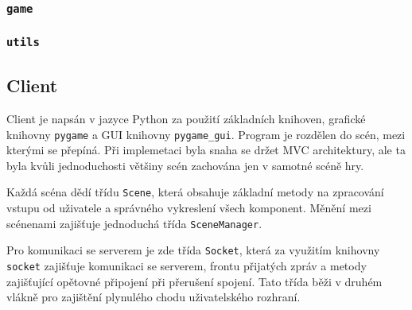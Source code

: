 \documentclass[11pt,a4paper]{article}
\begin{document}
\subsubsection{\texttt{game}}
\subsubsection{\texttt{utils}}

\subsection{Client}
Client je napsán v jazyce Python za použití základních knihoven, grafické knihovny \texttt{pygame} a GUI knihovny \texttt{pygame\_gui}. Program je rozdělen do scén, mezi kterými se přepíná. Při implemetaci byla snaha se držet MVC architektury, ale ta byla kvůli jednoduchosti většiny scén zachována jen v samotné scéně hry. 

Každá scéna dědí třídu \texttt{Scene}, která obsahuje základní metody na zpracování vstupu od uživatele a správného vykreslení všech komponent. Měnění mezi scénenami zajišťuje jednoduchá třída \texttt{SceneManager}.

Pro komunikaci se serverem je zde třída \texttt{Socket}, která za využitím knihovny \texttt{socket} zajišťuje komunikaci se serverem, frontu přijatých zpráv a metody zajišťující opětovné připojení při přerušení spojení. Tato třída běži v druhém vlákně pro zajištění plynulého chodu uživatelského rozhraní.
\end{document}
